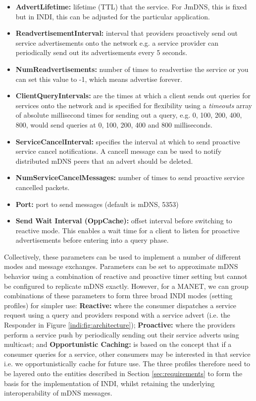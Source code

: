 \begin{itemize}

\item  \textbf{AdvertLifetime:} lifetime (TTL) that the service. For JmDNS, this is fixed but in INDI, this can be adjusted for the particular application. 
\item  \textbf{ReadvertisementInterval:} interval that providers proactively send out service advertisements onto the network e.g. a service provider can periodically send out its advertisements every 5 seconds.  
\item  \textbf{NumReadvertisements:}  number of times to readvertise the service or you can set this value to -1, which means advertise forever.
\item  \textbf{ClientQueryIntervals:}   are the times at which a client sends out queries for services onto the network and is 
specified for flexibility using a \emph{timeouts} array of absolute millisecond times for sending out a query, e.g. 0, 100, 200, 400, 800, would send queries at 0, 100, 200, 400 and 800 milliseconds.
\item  \textbf{ServiceCancelInterval:}  specifies the interval at which to send proactive service cancel notifications. A cancell message can be used to notify distributed mDNS peers that an advert should be deleted.
\item  \textbf{NumServiceCancelMessages:}  number of times to send proactive service cancelled packets.
\item \textbf{Port:}  port to send messages (default is mDNS, 5353)
\item \textbf{Send Wait Interval (OppCache):} offset interval before switching to reactive mode. This enables a wait time for a client to listen for proactive advertisements before entering into a query phase.

\end{itemize}

Collectively, these parameters can be used to implement a number of different modes and message exchanges.  Parameters can be set to approximate mDNS behavior using a combination of reactive and proactive timer setting but cannot be configured to replicate mDNS exactly.  However, for a MANET, we can group combinations of these parameters to form three broad INDI modes (setting profiles) for simpler use:  \textbf{Reactive:} where the consumer dispatches a service request using a query and providers respond with a service advert (i.e. the Responder in Figure  \ref{indi:fig:architecture}); \textbf{Proactive:} where the providers perform a service push by periodically sending out their service adverts using multicast;  and \textbf{Opportunistic Caching:}  is based on the concept that if a consumer queries for a service, other consumers may be interested in that service i.e. we opportunistically cache for future use.  The three profiles therefore need to be layered onto the entities described in Section \ref{sec:requirements} to form the basis for the implementation of INDI, whilst retaining the underlying interoperability of mDNS messages. 

